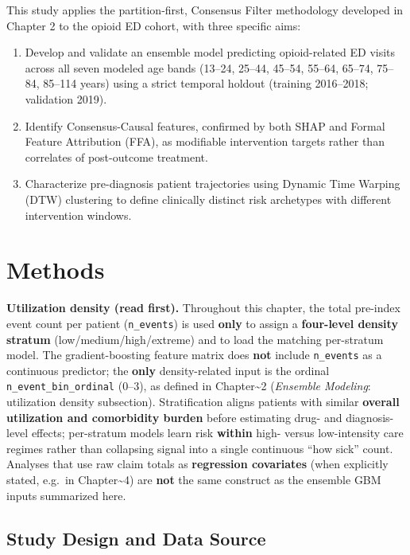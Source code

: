 \documentclass[
  12pt,
]{book}
\providecommand{\tightlist}{%
  \setlength{\itemsep}{0pt}\setlength{\parskip}{0pt}}
\begin{document}
This study applies the partition-first, Consensus Filter methodology
developed in Chapter 2 to the opioid ED cohort, with three specific
aims:

\begin{enumerate}
\def\labelenumi{\arabic{enumi}.}
\tightlist
\item
  Develop and validate an ensemble model predicting opioid-related ED
  visits across all seven modeled age bands (13--24, 25--44, 45--54,
  55--64, 65--74, 75--84, 85--114 years) using a strict temporal holdout
  (training 2016--2018; validation 2019).
\item
  Identify Consensus-Causal features, confirmed by both SHAP and Formal
  Feature Attribution (FFA), as modifiable intervention targets rather
  than correlates of post-outcome treatment.
\item
  Characterize pre-diagnosis patient trajectories using Dynamic Time
  Warping (DTW) clustering to define clinically distinct risk archetypes
  with different intervention windows.
\end{enumerate}

\chapter{Methods}\label{sec-methods}

\textbf{Utilization density (read first).} Throughout this chapter, the
total pre-index event count per patient (\texttt{n\_events}) is used
\textbf{only} to assign a \textbf{four-level density stratum}
(low/medium/high/extreme) and to load the matching per-stratum model.
The gradient-boosting feature matrix does \textbf{not} include
\texttt{n\_events} as a continuous predictor; the \textbf{only}
density-related input is the ordinal \texttt{n\_event\_bin\_ordinal}
(0--3), as defined in Chapter\textasciitilde2 (\emph{Ensemble Modeling}:
utilization density subsection). Stratification aligns patients with
similar \textbf{overall utilization and comorbidity burden} before
estimating drug- and diagnosis-level effects; per-stratum models learn
risk \textbf{within} high- versus low-intensity care regimes rather than
collapsing signal into a single continuous ``how sick'' count. Analyses
that use raw claim totals as \textbf{regression covariates} (when
explicitly stated, e.g.~in Chapter\textasciitilde4) are \textbf{not} the
same construct as the ensemble GBM inputs summarized here.

\section{Study Design and Data
Source}\label{study-design-and-data-source}
\end{document}

